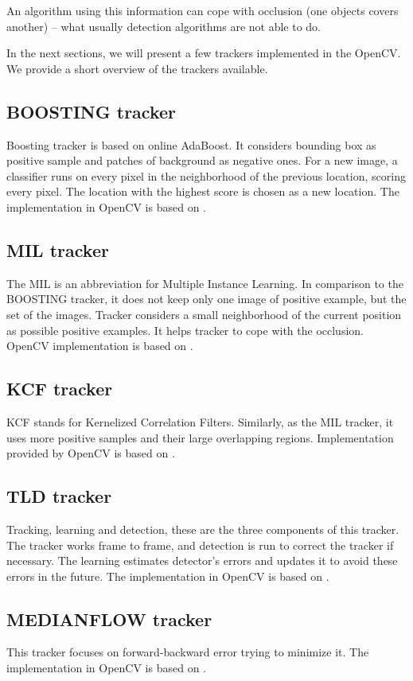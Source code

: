An algorithm using this information can cope with occlusion (one objects covers
another) -- what usually detection algorithms are not able to do.

In the next sections, we will present a few trackers implemented in the OpenCV. We
provide a short overview of the trackers available.

\subsection*{BOOSTING tracker}
Boosting tracker is based on online AdaBoost. It considers bounding box as
positive sample and patches of background as negative ones. For a new image, a
classifier runs on every pixel in the neighborhood of the previous location,
scoring every pixel. The location with the highest score is chosen as a new
location. The implementation in OpenCV is based on \citet*{boosting}.

\subsection*{MIL tracker}
The MIL is an abbreviation for Multiple Instance Learning. In comparison to the
BOOSTING tracker, it does not keep only one image of positive example, but the
set of the images. Tracker considers a small neighborhood of the
current position as possible positive examples. It helps tracker to cope with
the occlusion. OpenCV implementation is based on \citet*{mil}.

\subsection*{KCF tracker}
KCF stands for Kernelized Correlation Filters. Similarly, as the MIL tracker,
it uses more positive samples and their large overlapping regions.
Implementation provided by OpenCV is based on \citet*{kcf}.

\subsection*{TLD tracker}
Tracking, learning and detection, these are the three components of this
tracker. The tracker works frame to frame, and detection is run to correct the
tracker if necessary. The learning estimates detector's errors and updates it
to avoid these errors in the future. The implementation in OpenCV is based on
\citet*{tld}.

\subsection*{MEDIANFLOW tracker}
This tracker focuses on forward-backward error trying to minimize it. The
implementation in OpenCV is based on \citet*{medianflow}.

